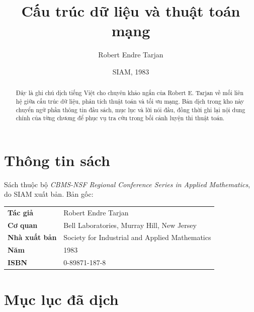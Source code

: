 \documentclass[11pt]{article}
\title{Cấu trúc dữ liệu và thuật toán mạng}
\author{Robert Endre Tarjan}
\date{SIAM, 1983}
\begin{document}
\maketitle


\renewcommand{\abstractname}{Tóm tắt}
\begin{abstract}
Đây là ghi chú dịch tiếng Việt cho chuyên khảo ngắn của Robert E. Tarjan về
mối liên hệ giữa cấu trúc dữ liệu, phân tích thuật toán và tối ưu mạng. Bản
dịch trong kho này chuyển ngữ phần thông tin đầu sách, mục lục và lời nói đầu,
đồng thời ghi lại nội dung chính của từng chương để phục vụ tra cứu trong bối
cảnh luyện thi thuật toán.
\end{abstract}

\section*{Thông tin sách}

Sách thuộc bộ \emph{CBMS-NSF Regional Conference Series in Applied
Mathematics}, do SIAM xuất bản. Bản gốc:

\begin{center}
\begin{tabular}{ll}
\textbf{Tác giả} & Robert Endre Tarjan \\
\textbf{Cơ quan} & Bell Laboratories, Murray Hill, New Jersey \\
\textbf{Nhà xuất bản} & Society for Industrial and Applied Mathematics \\
\textbf{Năm} & 1983 \\
\textbf{ISBN} & 0-89871-187-8
\end{tabular}
\end{center}

\section{Mục lục đã dịch}
\end{document}
